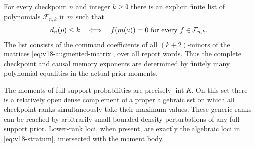 \begin{theorem}
\label{thm:v18-moment-strata}
For every checkpoint $n$ and integer $k\ge0$ there is an explicit finite
list of polynomials $\mathcal F_{n,k}$ in $m$ such that
\begin{equation}\label{eq:v18-stratum}
 d_n(\mu)\le k\quad\Longleftrightarrow\quad
 f(m(\mu))=0\ \hbox{for every }f\in\mathcal F_{n,k}.
\end{equation}
The list consists of the command coefficients of all $(k+2)$-minors
of the matrices \eqref{eq:v18-augmented-matrix}, over all report words.
Thus the complete checkpoint and causal memory exponents are determined
by finitely many polynomial equalities in the actual prior moments.

The moments of full-support probabilities are precisely $\operatorname{int}K$.
On this set there is a relatively open dense complement of a proper
algebraic set on which all checkpoint ranks simultaneously take their
maximum values. These generic ranks can be reached by arbitrarily small
bounded-density perturbations of any full-support prior. Lower-rank
loci, when present, are exactly the algebraic loci in
\eqref{eq:v18-stratum}, intersected with the moment body.
\end{theorem}
